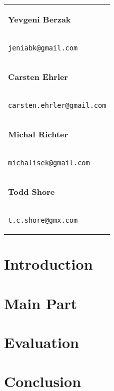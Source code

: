 \documentclass[paper=a4,draft=false]{scrartcl}
\begin{document}
\begin{titlepage}
  \begin{flushright}
    \begin{tabular}{l}
      \begin{large}\textbf{Yevgeni Berzak}\end{large} \\
      \begin{large}\texttt{jeniabk@gmail.com} \end{large}
      \vspace{.20in}\\
      \begin{large}\textbf{Carsten Ehrler}\end{large} \\
      \begin{large}\texttt{carsten.ehrler@gmail.com} \end{large}
      \vspace{.20in}\\
      \begin{large}\textbf{Michal Richter}\end{large} \\
      \begin{large}\texttt{michalisek@gmail.com} \end{large}
      \vspace{.20in}\\
      \begin{large}\textbf{Todd Shore}\end{large} \\
      \begin{large}\texttt{t.c.shore@gmx.com} \end{large}
    \end{tabular}
  \end{flushright}
\end{titlepage}

\newpage
\thispagestyle{empty}
\mbox{}


\tableofcontents

\begin{abstract}
\end{abstract}

\section{Introduction}\label{sec:introduction}


\section{Main Part}\label{sec:main_part}


\section{Evaluation}\label{sec:evaluation}


\section{Conclusion}\label{sec:conclusion}


\appendix




\end{document}
